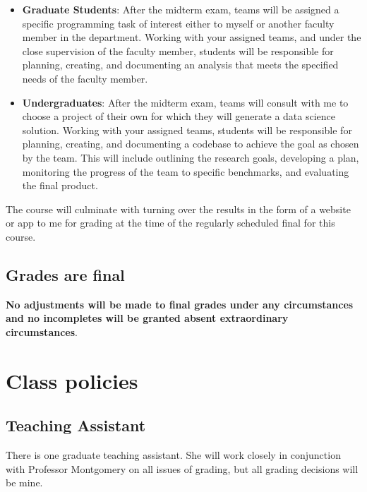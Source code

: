 \documentclass[11pt]{article}
\begin{document}
\begin{itemize}
\item \textbf{Graduate Students}: After the midterm exam, teams will be
  assigned a specific programming task of interest either to myself or
  another faculty member in the department.  Working with your
  assigned teams, and under the close supervision of the faculty
  member, students will be responsible for planning, creating, and
  documenting an analysis  that meets the specified needs of the
  faculty member.  
\item \textbf{Undergraduates}: After the midterm exam, teams will
  consult with me to choose a project of their own for which they will
  generate a data science solution.  Working with your assigned teams,
  students will be responsible for planning, creating, and documenting
  a codebase to achieve the goal as chosen by the team.  This will
  include outlining the research goals, developing a plan, monitoring
  the progress of the team to specific benchmarks, and evaluating the
  final product.  
\end{itemize}

\noindent The course will culminate with turning over the results in
the form of a website or app to me for grading at the time of the
regularly scheduled final for this course.

\subsection*{Grades are final}

\textbf{No adjustments will be made to final grades under any circumstances
and no incompletes will be granted absent extraordinary
circumstances}.  

\section*{Class policies}

\subsection*{Teaching Assistant}

There is one graduate teaching assistant. She will work closely in
conjunction with Professor Montgomery on all issues of grading, but
all grading decisions will be mine.  
\vspace{.2cm}
\end{document}
